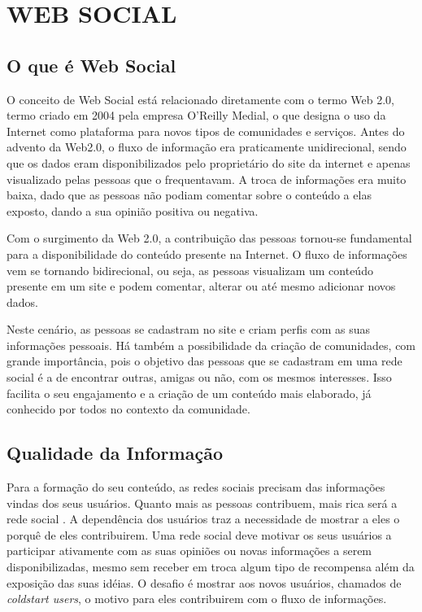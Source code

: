 \chapter{WEB SOCIAL} %
\label{cha:web_social}

\section{O que é Web Social}

O conceito de Web Social está relacionado diretamente com o termo Web 2.0, termo criado em 2004 pela empresa O'Reilly Medial, o que designa o uso da Internet como plataforma para novos tipos de comunidades e serviços. Antes do advento da Web2.0, o fluxo de informação era praticamente unidirecional, sendo que os dados eram disponibilizados pelo proprietário do site da internet e apenas visualizado pelas pessoas que o frequentavam. A troca de informações era muito baixa, dado que as pessoas não podiam comentar sobre o conteúdo a elas exposto, dando a sua opinião positiva ou negativa.

Com o surgimento da Web 2.0, a contribuição das pessoas tornou-se fundamental para a disponibilidade do conteúdo presente na Internet. O fluxo de informações vem se tornando bidirecional, ou seja, as pessoas visualizam um conteúdo presente em um site e podem comentar, alterar ou até mesmo adicionar novos dados.

Neste cenário, as pessoas se cadastram no site e criam perfis com as suas informações pessoais. Há também a possibilidade da criação de comunidades, com grande importância, pois o objetivo das pessoas que se cadastram em uma rede social é a de encontrar outras, amigas ou não, com os mesmos interesses. Isso facilita o seu engajamento e a criação de um conteúdo mais elaborado, já conhecido por todos no contexto da comunidade.

\section{Qualidade da Informação}

Para a formação do seu conteúdo, as redes sociais precisam das informações vindas dos seus usuários. Quanto mais as pessoas contribuem, mais rica será a rede social \cite{BurkeFeedMe}. A dependência dos usuários traz a necessidade de mostrar a eles o porquê de eles contribuirem. Uma rede social deve motivar os seus usuários a participar ativamente com as suas opiniões ou novas informações a serem disponibilizadas, mesmo sem receber em troca algum tipo de recompensa além da exposição das suas idéias. O desafio é mostrar aos novos usuários, chamados de \textit{coldstart users}, o motivo para eles contribuirem com o fluxo de informações.

